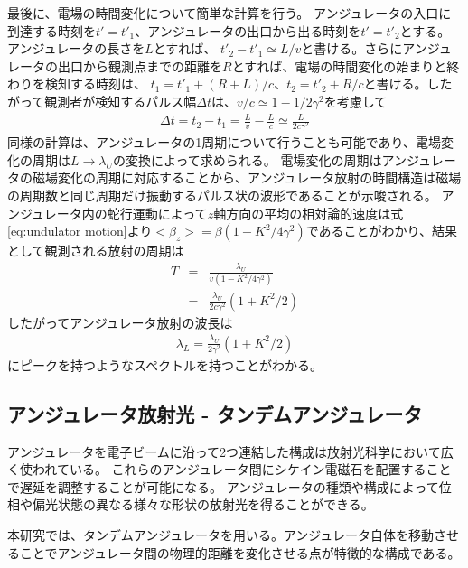 \documentclass[a4paper,11pt,uplatex]{jsbook}
\begin{document}
最後に、電場の時間変化について簡単な計算を行う。
アンジュレータの入口に到達する時刻を$t' = t'_1 $、アンジュレータの出口から出る時刻を$t' = t'_2$とする。アンジュレータの長さを$L$とすれば、
$t'_2 - t'_1 \simeq L / v$と書ける。さらにアンジュレータの出口から観測点までの距離を$R$とすれば、電場の時間変化の始まりと終わりを検知する時刻は、
$t_1 = t'_1 + (R + L)/c$、$t_2 = t'_2 + R/c$と書ける。したがって観測者が検知するパルス幅$\Delta t$は、$v/c \simeq 1- 1/2\gamma^2$を考慮して
\begin{eqnarray}
  \Delta t = t_2 - t_1 = \frac{L}{v}  - \frac{L}{c} \simeq \frac{L}{2c\gamma^2}
\end{eqnarray}
同様の計算は、アンジュレータの1周期について行うことも可能であり、電場変化の周期は$L\rightarrow \lambda_U$の変換によって求められる。
電場変化の周期はアンジュレータの磁場変化の周期に対応することから、アンジュレータ放射の時間構造は磁場の周期数と同じ周期だけ振動するパルス状の波形であることが示唆される。
アンジュレータ内の蛇行運動によって$z$軸方向の平均の相対論的速度は式\ref{eq:undulator motion}より$<\beta_z> =\beta (1-K^2/4\gamma^2)$であることがわかり、結果として観測される放射の周期は
\begin{eqnarray}
  T &=& \frac{\lambda_U}{v(1-K^2/4\gamma^2)} \\
  &=& \frac{\lambda_U}{2c\gamma^2}(1 + K^2/2)
\end{eqnarray}
したがってアンジュレータ放射の波長は
\begin{eqnarray}
  \lambda_L = \frac{\lambda_U}{2\gamma^2}(1+K^2/2)
\end{eqnarray}
にピークを持つようなスペクトルを持つことがわかる。

\subsection{アンジュレータ放射光 - タンデムアンジュレータ}
アンジュレータを電子ビームに沿って2つ連結した構成は放射光科学において広く使われている。
これらのアンジュレータ間にシケイン電磁石を配置することで遅延を調整することが可能になる。
アンジュレータの種類や構成によって位相や偏光状態の異なる様々な形状の放射光を得ることができる。

本研究では、タンデムアンジュレータを用いる。アンジュレータ自体を移動させることでアンジュレータ間の物理的距離を変化させる点が特徴的な構成である。
\end{document}
